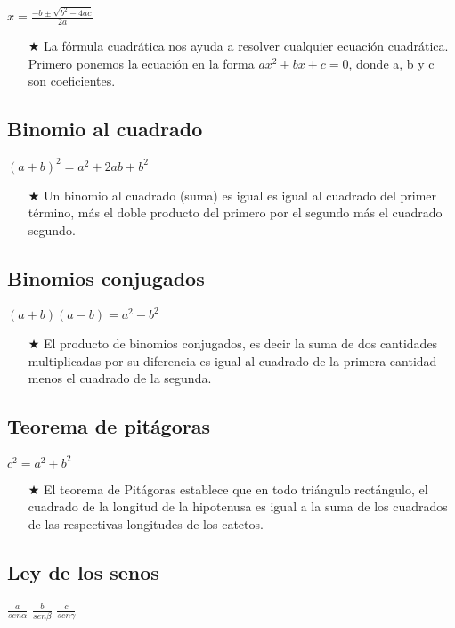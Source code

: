 \documentclass[a4peper, 12pt]{article}
\begin{document}
$x = \frac{-b\pm \sqrt{b^2 - 4ac}}{2a}$
\begin{itemize}
    \item[$\bigstar$] La fórmula cuadrática nos ayuda a resolver cualquier ecuación cuadrática. Primero ponemos la ecuación en la forma $ax^2 + bx + c = 0$, donde a, b y c son coeficientes.
\end{itemize}

\subsection{Binomio al cuadrado}

$(a + b )^2  = a^2 + 2ab + b^2$
\begin{itemize}
    \item[$\bigstar$] Un binomio al cuadrado (suma) es igual es igual al cuadrado del primer término, más el doble producto del primero por el segundo más el cuadrado segundo.
\end{itemize}
\subsection{Binomios conjugados}
$(a + b)(a - b)= a^2 - b^2 $
\begin{itemize}
    \item[$\bigstar$] El producto de binomios conjugados, es decir la suma de dos cantidades multiplicadas por su diferencia es igual al cuadrado de la primera cantidad menos el cuadrado de la segunda.
\end{itemize}

\subsection{Teorema de pitágoras}

$c^2 = a^2  + b^2 $
\begin{itemize}
    \item[$\bigstar$] El teorema de Pitágoras establece que en todo triángulo rectángulo, el cuadrado de la longitud de la hipotenusa es igual a la suma de los cuadrados de las respectivas longitudes de los catetos.
\end{itemize}

\subsection{Ley de los senos}
 
 $\frac{a}{sen \alpha}$ $\frac{b}{sen \beta}$ $\frac{c}{sen \gamma}$
\end{document}
